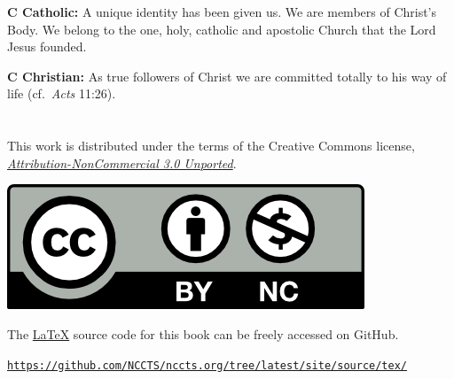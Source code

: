 \documentclass{article}
\begin{document}
\textbf{C Catholic:} A unique identity has been given us. We are members of
Christ's Body. We belong to the one, holy, catholic and apostolic Church that
the Lord Jesus founded. \newline

\textbf{C Christian:} As true followers of Christ we are committed totally to
his way of life (cf.\ \emph{Acts} 11:26).


\section{} 

\begin{center}

This work is distributed under the terms of the Creative Commons license,
\emph{\href{http://creativecommons.org/licenses/by-nc/3.0/legalcode}{
            Attribution-NonCommercial 3.0 Unported}}.

\href{http://creativecommons.org/licenses/by-nc/3.0/}{
  \includegraphics[scale=0.6]{by-nc}
  }

The \href{http://www.latex-project.org/}{\LaTeX} source code for this book can
be freely accessed on GitHub.

\texttt{\href{https://github.com/NCCTS/nccts.org/tree/latest/site/source/tex/}
             {https://github.com/NCCTS/nccts.org/tree/latest/site/source/tex/}}

\end{center}

\end{document}
